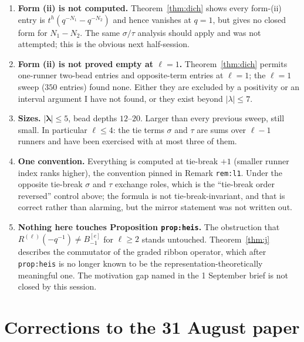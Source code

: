 \documentclass[11pt]{article}
\theoremstyle{definition}
\theoremstyle{remark}
\newcommand{\bl}{\boldsymbol{\lambda}}
\begin{document}
\begin{enumerate}
\item \textbf{Form (ii) is not computed.} Theorem~\ref{thm:dich} shows every form-(ii)
entry is $t^{h}(q^{-N_1}-q^{-N_2})$ and hence vanishes at $q=1$, but gives no closed form
for $N_1-N_2$. The same $\sigma/\tau$ analysis should apply and was not attempted; this
is the obvious next half-session.

\item \textbf{Form (ii) is not proved empty at $\ell=1$.} Theorem~\ref{thm:dich} permits
one-runner two-bead entries and opposite-term entries at $\ell=1$; the $\ell=1$ sweep
($350$ entries) found none. Either they are excluded by a positivity or an interval
argument I have not found, or they exist beyond $|\lambda|\le7$.

\item \textbf{Sizes.} $|\bl|\le5$, bead depths $12$--$20$. Larger than every previous
sweep, still small. In particular $\ell\le4$: the tie terms $\sigma$ and $\tau$ are
sums over $\ell-1$ runners and have been exercised with at most three of them.

\item \textbf{One convention.} Everything is computed at tie-break $+1$ (smaller runner
index ranks higher), the convention pinned in Remark \texttt{rem:l1}. Under the opposite
tie-break $\sigma$ and $\tau$ exchange roles, which is the ``tie-break order reversed''
control above; the formula is not tie-break-invariant, and that is correct rather than
alarming, but the mirror statement was not written out.

\item \textbf{Nothing here touches Proposition \texttt{prop:heis}.} The obstruction that
$R^{(\ell)}(-q^{-1})\ne B^{[e]}_{-1}$ for $\ell\ge2$ stands untouched. Theorem~\ref{thm:j}
describes the commutator of the graded ribbon operator, which after
\texttt{prop:heis} is no longer known to be the representation-theoretically meaningful
one. The motivation gap named in the 1 September brief is not closed by this session.
\end{enumerate}

\section{Corrections to the 31 August paper}\label{sec:corrections}
\end{document}
